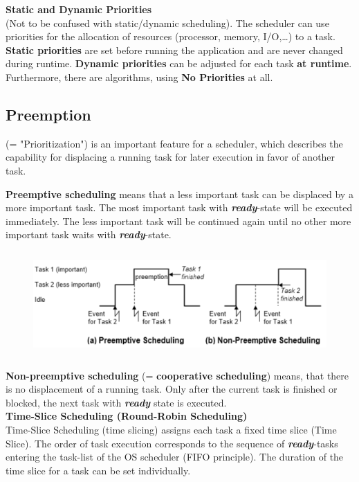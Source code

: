{\rot\bf Static and Dynamic Priorities}\\

(Not to be confused with static/dynamic scheduling). The scheduler can use priorities for the allocation of resources (processor, memory, I/O,{\dots}) to a task. \textbf{Static priorities} are set before running the application and are never changed during runtime. \textbf{Dynamic priorities} can be adjusted for each task \textbf{at runtime}. Furthermore, there are algorithms, using \textbf{No Priorities} at all. \\
\newpage
\subsection{Preemption}

(= "Prioritization") is an important feature for a scheduler, which describes the capability for displacing a running task for later execution in favor of another task. 

\textbf{Preemptive scheduling }means that a less important task can be displaced by a more important task. The most important task with \textbf{\textit{ready}}-state will be executed immediately. The less important task will be continued again until no other more important task waits with \textbf{\textit{ready}}-state.

	\begin{figure}[h]
    \centering
    \includegraphics[width=14cm, height=4cm]{Images/image89.png}
    \label{fig:Fig }
    \end{figure}

\textbf{Non-preemptive scheduling} (= \textbf{cooperative scheduling}) means, that there is no displacement of a running task. Only after the current task is finished or blocked, the next task with \textbf{\textit{ready}} state is executed.\\


{\rot\bf Time-Slice Scheduling (Round-Robin Scheduling)}\\

Time-Slice Scheduling (time slicing) assigns each task a fixed time slice (Time Slice). The order of task execution corresponds to the sequence of \textbf{\textit{ready}}-tasks entering the task-list of the OS scheduler (FIFO principle). The duration of the time slice for a task can be set individually.\\

